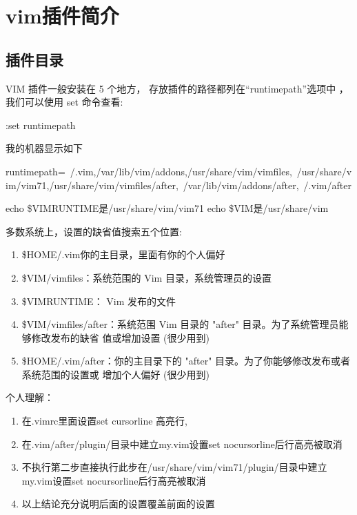 \chapter{vim插件简介}

\section{插件目录}
VIM 插件一般安装在 5 个地方， 存放插件的路径都列在“runtimepath”选项中
，我们可以使用 set 命令查看:
\begin{code}
:set runtimepath 
\end{code}
我的机器显示如下
\begin{code}
runtimepath=~/.vim,/var/lib/vim/addons,/usr/share/vim/vimfiles,\
/usr/share/vim/vim71,/usr/share/vim/vimfiles/after,\
/var/lib/vim/addons/after,~/.vim/after
\end{code}
echo \$VIMRUNTIME是/usr/share/vim/vim71\newline
echo \$VIM是/usr/share/vim\newline

多数系统上，设置的缺省值搜索五个位置:
\begin{enumerate}
	\item \$HOME/.vim你的主目录，里面有你的个人偏好
	\item \$VIM/vimfiles：系统范围的 Vim 目录，系统管理员的设置
	\item \$VIMRUNTIME： Vim 发布的文件
	\item \$VIM/vimfiles/after：系统范围 Vim 目录的 "after" 目录。为了系统管理员能够修改发布的缺省
	   值或增加设置 (很少用到)
	\item \$HOME/.vim/after：你的主目录下的 "after" 目录。为了你能够修改发布或者系统范围的设置或
	   增加个人偏好 (很少用到)
\end{enumerate}
个人理解：
\begin{enumerate}
	\item 在.vimrc里面设置set cursorline 高亮行,
	\item 在.vim/after/plugin/目录中建立my.vim设置set nocursorline后行高亮被取消
	\item 不执行第二步直接执行此步在/usr/share/vim/vim71/plugin/目录中建立my.vim设置set nocursorline后行高亮被取消	
	\item 以上结论充分说明后面的设置覆盖前面的设置
\end{enumerate}

